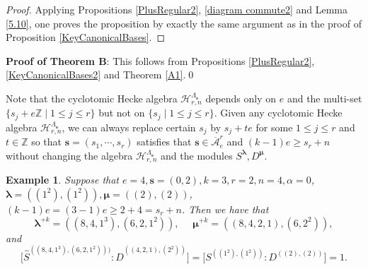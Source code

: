 \documentclass[a4paper,10pt]{amsart}
\theoremstyle{plain}
\renewcommand{\H}{\mathcal{H}}
\def\bs{{\boldsymbol{s}}}
\def\Z{{\mathbb Z}}
\def\Lam{\Lambda}
\def\blam{{\boldsymbol \lambda}}
\def\bmu{{\boldsymbol \mu}}
\theoremstyle{plain}
\newtheorem{example}[theorem]{Example}
\numberwithin{equation}{section}
\begin{document}
\begin{proof} Applying Propositions \ref{PlusRegular2}, \ref{diagram commute2} and Lemma \ref{5.10}, one proves the proposition by exactly the same argument as in the proof of Proposition \ref{KeyCanonicalBases}.
\end{proof}

\medskip
\noindent
{\textbf{Proof of Theorem B}: } This follows from Propositions \ref{PlusRegular2}, \ref{KeyCanonicalBases2} and Theorem \ref{A1}.\hfill\qed
\medskip


Note that the cyclotomic Hecke algebra $\H_{r,n}^{\Lam_\bs}$ depends only on $e$ and the multi-set $\{s_j+e\Z\mid 1\leq j\leq r\}$ but not on $\{s_j\mid 1\leq j\leq r\}$. Given any cyclotomic Hecke algebra $\H_{r,n}^{\Lam_\bs}$,
we can always replace certain $s_j$ by $s_j+te$ for some $1\leq j\leq r$ and $t\in\Z$ so that $\bs=(s_1,\cdots,s_r)$ satisfies that $\bs\in \overline{\mathcal A}^r_e$ and $(k-1)e \ge s_r+n$ without changing the algebra $\H_{r,n}^{\Lam_\bs}$ and the modules $S^\blam, D^\bmu$.

\begin{example} Suppose that $e=4, \bs=(0,2), k=3, r=2, n=4, \alpha=0$, $\blam=((1^2),(1^2)), \bmu=((2),(2))$, $(k-1)e=(3-1)e\ge 2+4=s_r+n$. Then we have that $$
\blam^{+k}=((8, 4, 1^3),(6, 2, 1^2)),\,\,\quad\bmu^{+k}=((8, 4,2, 1),(6, 2^2)), $$
and $$
\bigl[\hat{S}^{((8, 4, 1^3),(6, 2, 1^2)))}:\hat{D}^{((4, 2, 1),(2^2))}\bigr]=\bigl[S^{((1^2),(1^2))}:D^{((2),(2))}\bigr]=1.
$$
\end{example}
\end{document}
